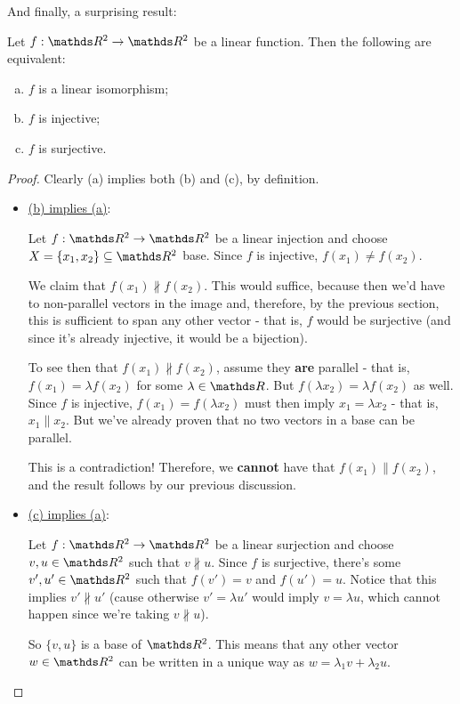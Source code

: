 And finally, a surprising result:

\begin{theorem}
	Let $f:\R^2\to\R^2$ be a linear function. Then the following are equivalent:
	\begin{enumerate}[(a)]
		\item $f$ is a linear isomorphism;
		\item $f$ is injective;
		\item $f$ is surjective.
	\end{enumerate}
\end{theorem}
\begin{proof}
	Clearly (a) implies both (b) and (c), by definition.
	
	\begin{itemize}
		\item \underline{(b) implies (a)}:
		
		Let $f:\R^2\to\R^2$ be a linear injection and choose $X=\{x_1,x_2\}\subseteq \R^2$  base. Since $f$ is injective, $f(x_1)\neq f(x_2)$.
		
		We claim that $f(x_1)\nparallel f(x_2)$. This would suffice, because then we'd have to non-parallel vectors in the image and, therefore, by the previous section, this is sufficient to span any other vector - that is, $f$ would be surjective (and since it's already injective, it would be a bijection).
		
		To see then that $f(x_1)\nparallel f(x_2)$, assume they \textbf{are} parallel - that is, $f(x_1)=\lambda f(x_2)$ for some $\lambda\in\R$. But $f(\lambda x_2)=\lambda f(x_2)$ as well. Since $f$ is injective, $f(x_1)=f(\lambda x_2)$ must then imply $x_1=\lambda x_2$ - that is, $x_1\parallel x_2$. But we've already proven that no two vectors in a base can be parallel.
		
		This is a contradiction! Therefore, we \textbf{cannot} have that $f(x_1)\parallel f(x_2)$, and the result follows by our previous discussion.
		
		\item \underline{(c) implies (a)}:
		
		Let $f:\R^2\to \R^2$ be a linear surjection and choose $v,u\in \R^2$ such that $v\nparallel u$. Since $f$ is surjective, there's some $v',u'\in \R^2$ such that $f(v')=v$ and $f(u')=u$. Notice that this implies $v'\nparallel u'$ (cause otherwise $v'=\lambda u'$ would imply $v=\lambda u$, which cannot happen since we're taking $v\nparallel u$).
		
		So $\{v,u\}$ is a base of $\R^2$. This means that any other vector $w\in \R^2$ can be written in a unique way as $w=\lambda_1v+\lambda_2u$.
		

\end{itemize}
\end{proof}
